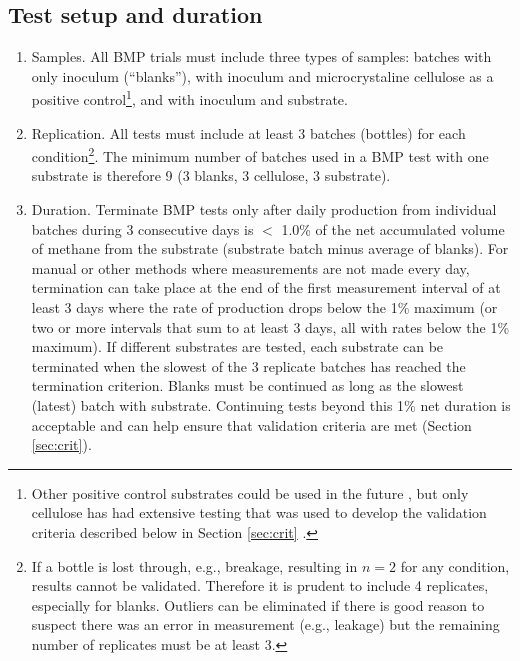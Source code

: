 \documentclass[]{article}
\begin{document}
\subsection{Test setup and duration}
\label{sec:setup}
\begin{enumerate}
  \item Samples. 
    All BMP trials must include three types of samples: batches with only inoculum (``blanks''), with inoculum and microcrystaline cellulose as a positive control\footnote{
      Other positive control substrates could be used in the future \citep{kochEvaluationCommonSupermarket2020}, but only cellulose has had extensive testing that was used to develop the validation criteria described below in Section \ref{sec:crit} \citep{hafnerImprovingInterlaboratoryReproducibility2020}.
    }, and with inoculum and substrate.
    \item Replication. 
    All tests must include at least 3 batches (bottles) for each condition\footnote{
      If a bottle is lost through, e.g., breakage, resulting in $n=2$ for any condition, results cannot be validated.
      Therefore it is prudent to include 4 replicates, especially for blanks.
      Outliers can be eliminated if there is good reason to suspect there was an error in measurement (e.g., leakage) but the remaining number of replicates must be at least 3.
    }.
    The minimum number of batches used in a BMP test with one substrate is therefore 9 (3 blanks, 3 cellulose, 3 substrate).
  \item Duration. 
    Terminate BMP tests only after daily  production from individual batches during 3 consecutive days is $<$ 1.0\% of the net accumulated volume of methane from the substrate (substrate batch minus average of blanks). 
    For manual or other methods where measurements are not made every day, termination can take place at the end of the first measurement interval of at least 3 days where the rate of production drops below the 1\% maximum (or two or more intervals that sum to at least 3 days, all with rates below the 1\% maximum).
    If different substrates are tested, each substrate can be terminated when the slowest of the 3 replicate batches has reached the termination criterion.
    Blanks must be continued as long as the slowest (latest) batch with substrate.
    Continuing tests beyond this 1\% net duration is acceptable and can help ensure that validation criteria are met (Section \ref{sec:crit}).
\end{enumerate}
\end{document}
